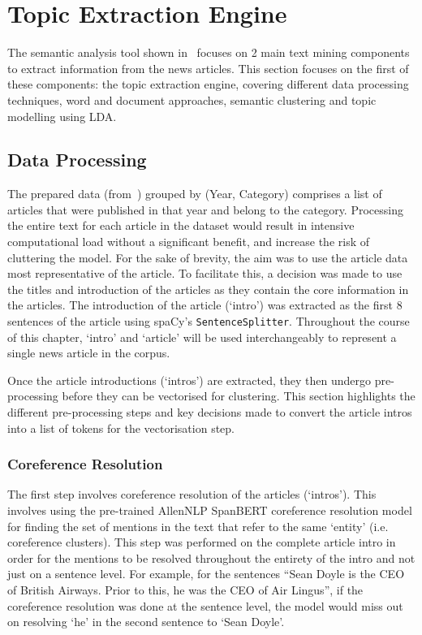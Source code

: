\chapter{Topic Extraction Engine} \label{ch:4:topic}

The semantic analysis tool shown in~ focuses on 2 main text mining components to extract information from the news articles. This section focuses on the first of these components: the topic extraction engine, covering different data processing techniques, word and document approaches, semantic clustering and topic modelling using LDA. 

\section{Data Processing} \label{s:procesing_topic_engine}

The prepared data (from~) grouped by (Year, Category) comprises a list of articles that were published in that year and belong to the category. Processing the entire text for each article in the dataset would result in intensive computational load without a significant benefit, and increase the risk of cluttering the model. For the sake of brevity, the aim was to use the article data most representative of the article. To facilitate this, a decision was made to use the titles and introduction of the articles as they contain the core information in the articles. The introduction of the article (`intro') was extracted as the first 8 sentences of the article using spaCy's \texttt{SentenceSplitter}. Throughout the course of this chapter, `intro' and `article' will be used interchangeably to represent a single news article in the corpus. 

Once the article introductions (`intros') are extracted, they then undergo pre-processing before they can be vectorised for clustering. This section highlights the different pre-processing steps and key decisions made to convert the article intros into a list of tokens for the vectorisation step.

\subsection{Coreference Resolution} \label{coref}
The first step involves coreference resolution of the articles (`intros'). This involves using the pre-trained AllenNLP SpanBERT coreference resolution model for finding the set of mentions in the text that refer to the same `entity' (i.e. coreference clusters). This step was performed on the complete article intro in order for the mentions to be resolved throughout the entirety of the intro and not just on a sentence level. For example, for the sentences ``Sean Doyle is the CEO of British Airways. Prior to this, he was the CEO of Air Lingus'', if the coreference resolution was done at the sentence level, the model would miss out on resolving `he' in the second sentence to `Sean Doyle'.

